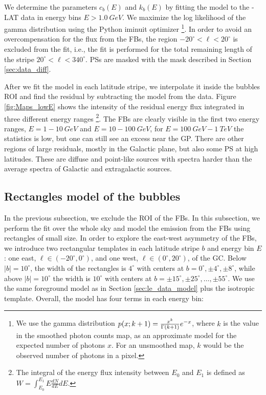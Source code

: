 We determine the parameters $c_{b}(E)$ and $k_{b}(E)$ by fitting the model to the \Fermi-LAT data in energy bins $E > \SI{1.0}{GeV}$.
We maximize the log likelihood of the gamma distribution using the Python iminuit optimizer%
\footnote{We use the gamma distribution $p(x; k + 1) = \frac{x^k}{\Gamma (k + 1)}e^{-x}$, where $k$ is the value in the smoothed photon counts map,
as an approximate model for the expected number of photons $x$.
For an unsmoothed map, $k$ would be the observed number of photons in a pixel.
}.
In order to avoid an overcompensation 
for the flux from the FBs, the region $-20^\circ < \ell < 20^\circ$ is excluded from the fit, i.e., the fit is performed for 
the total remaining length of the stripe $20^\circ < \ell < 340^\circ$.
PSs are masked with the mask described in Section \ref{sec:data_diff}.


After we fit the model in each latitude stripe, we interpolate it inside the bubbles ROI and 
find the residual by subtracting the model from the data.
Figure \ref{fig:Maps_lowE} shows the intensity of the residual energy flux integrated in three different energy ranges%
\footnote{The integral of the energy flux intensity between $E_0$ and $E_1$ is defined as
$W = \int_{E_0}^{E_1} E \frac{dN}{dE} dE.$}.
The FBs are clearly visible in the first two energy ranges, $E = 1 - \SI{10}{GeV}$ and $E = 10 - \SI{100}{GeV}$, for 
$E = \SI{100}{GeV} - \SI{1}{TeV}$ the statistics is low, but one can still see an excess near the GP.
There are other regions of large residuals, mostly in the Galactic plane, but also some PS at high latitudes.
These are diffuse and point-like sources with spectra harder than the average spectra of Galactic and
extragalactic sources.

\subsection{Rectangles model of the bubbles}
\label{sec:box_model}

In the previous subsection, we exclude the ROI of the FBs.
In this subsection, we perform the fit over the whole sky and model the emission from the FBs using rectangles of small size.
In order to explore the east-west asymmetry of the FBs, 
we introduce two rectangular templates in each latitude stripe $b$ and energy bin $E$: 
one east, $\ell \in (-20^\circ, 0^\circ)$, and one west, $\ell \in (0^\circ, 20^\circ)$, of the GC.
Below $|b| = 10^\circ$, the width of the rectangles is $4^\circ$ with centers at $b = 0^\circ,  \pm 4^\circ,  \pm 8^\circ$,
while above $|b| = 10^\circ$ the width is $10^\circ$ with centers at $b = \pm 15^\circ,  \pm 25^\circ,  \ldots, \pm 55^\circ$.
We use the same foreground model as in Section \ref{sec:le_data_model} plus the isotropic template.
Overall, the model has four terms in each energy bin:

